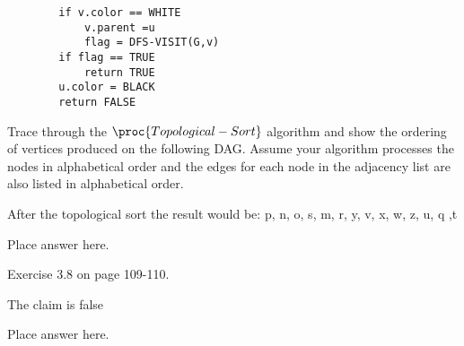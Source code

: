 \documentclass[addpoints,11pt]{exam}
\begin{document}
\begin{questions}
\begin{lstlisting}
		if v.color == WHITE
			v.parent =u
			flag = DFS-VISIT(G,v)
		if flag == TRUE
			return TRUE
		u.color = BLACK
		return FALSE 
\end{lstlisting}

\ifprintanswers
\newpage
\else
\bigskip
\fi





\question[5]
Trace through the $\proc{Topological-Sort}$ algorithm and show the ordering of vertices produced on the following DAG.  Assume your  algorithm processes the nodes in alphabetical order and the edges for each node in the adjacency list are also listed in alphabetical order.\\
\begin{center}
	After the topological sort the result would be: p, n, o, s, m, r, y, v, x, w, z, u, q ,t
\end{center}  

\begin{solutionorbox}
	Place answer here.
\end{solutionorbox}

\ifprintanswers
\newpage
\else
\bigskip
\fi


\question[10] Exercise 3.8 on page 109-110.

\begin{center}
	The claim is false
	
\end{center}


\begin{solutionorbox}
	Place answer here.
\end{solutionorbox}



\end{questions}
\end{document}
